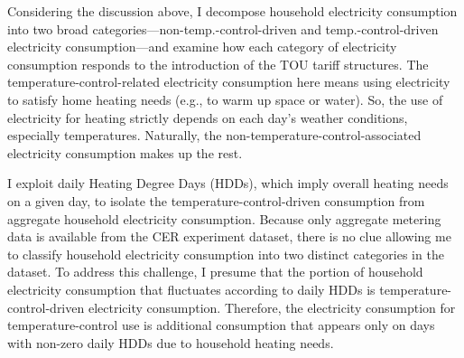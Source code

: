 Considering the discussion above, I decompose household electricity consumption into two broad categories---non-temp.-control-driven and temp.-control-driven electricity consumption---and examine how each category of electricity consumption responds to the introduction of the TOU tariff structures. The temperature-control-related electricity consumption here means using electricity to satisfy home heating needs (e.g., to warm up space or water). So, the use of electricity for heating strictly depends on each day's weather conditions, especially temperatures. Naturally, the non-temperature-control-associated electricity consumption makes up the rest. 

I exploit daily Heating Degree Days (HDDs), which imply overall heating needs on a given day, to isolate the temperature-control-driven consumption from aggregate household electricity consumption. Because only aggregate metering data is available from the CER experiment dataset, there is no clue allowing me to classify household electricity consumption into two distinct categories in the dataset. To address this challenge, I presume that the portion of household electricity consumption that fluctuates according to daily HDDs is temperature-control-driven electricity consumption. Therefore, the electricity consumption for temperature-control use is additional consumption that appears only on days with non-zero daily HDDs due to household heating needs.


